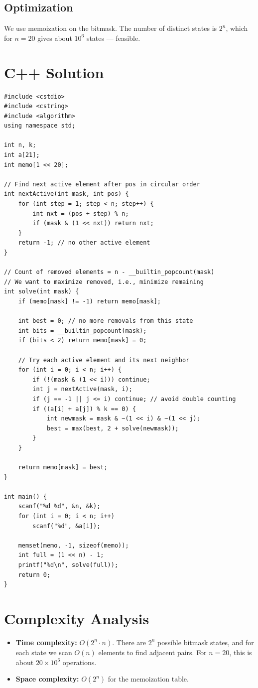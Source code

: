 \documentclass[11pt,a4paper]{article}
\begin{document}
\subsection{Optimization}
We use memoization on the bitmask. The number of distinct states is $2^n$, which for
$n = 20$ gives about $10^6$ states --- feasible.

\section{C++ Solution}

\begin{lstlisting}
#include <cstdio>
#include <cstring>
#include <algorithm>
using namespace std;

int n, k;
int a[21];
int memo[1 << 20];

// Find next active element after pos in circular order
int nextActive(int mask, int pos) {
    for (int step = 1; step < n; step++) {
        int nxt = (pos + step) % n;
        if (mask & (1 << nxt)) return nxt;
    }
    return -1; // no other active element
}

// Count of removed elements = n - __builtin_popcount(mask)
// We want to maximize removed, i.e., minimize remaining
int solve(int mask) {
    if (memo[mask] != -1) return memo[mask];

    int best = 0; // no more removals from this state
    int bits = __builtin_popcount(mask);
    if (bits < 2) return memo[mask] = 0;

    // Try each active element and its next neighbor
    for (int i = 0; i < n; i++) {
        if (!(mask & (1 << i))) continue;
        int j = nextActive(mask, i);
        if (j == -1 || j <= i) continue; // avoid double counting
        if ((a[i] + a[j]) % k == 0) {
            int newmask = mask & ~(1 << i) & ~(1 << j);
            best = max(best, 2 + solve(newmask));
        }
    }

    return memo[mask] = best;
}

int main() {
    scanf("%d %d", &n, &k);
    for (int i = 0; i < n; i++)
        scanf("%d", &a[i]);

    memset(memo, -1, sizeof(memo));
    int full = (1 << n) - 1;
    printf("%d\n", solve(full));
    return 0;
}
\end{lstlisting}

\section{Complexity Analysis}

\begin{itemize}
  \item \textbf{Time complexity:} $O(2^n \cdot n)$. There are $2^n$ possible bitmask states,
        and for each state we scan $O(n)$ elements to find adjacent pairs. For $n = 20$,
        this is about $20 \times 10^6$ operations.
  \item \textbf{Space complexity:} $O(2^n)$ for the memoization table.
\end{itemize}
\end{document}
